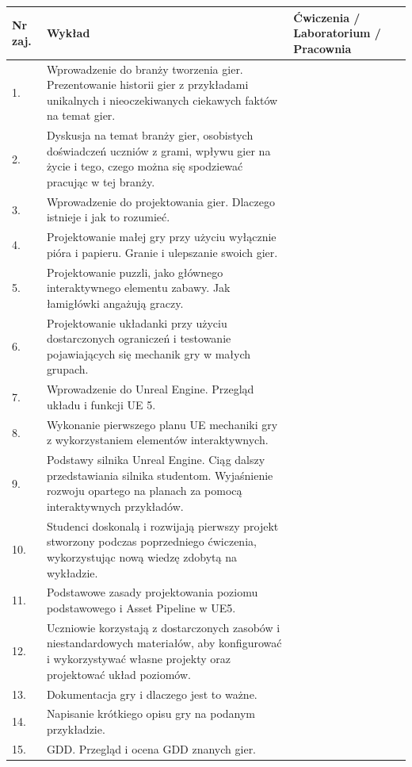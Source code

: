 \documentclass[12pt, a4paper]{article}
\begin{document}
\begin{longtable}{|p{1.5cm}|p{6.5cm}|p{6.5cm}|}
\hline
\textbf{Nr zaj.} & \textbf{Wykład} & \textbf{Ćwiczenia / Laboratorium / Pracownia} \\\hline
\endhead
  \hline
  1. & Wprowadzenie do branży tworzenia gier. Prezentowanie historii gier z przykładami unikalnych i nieoczekiwanych ciekawych faktów na temat gier. &  \\
  \hline
  2. & Dyskusja na temat branży gier, osobistych doświadczeń uczniów z grami, wpływu gier na życie i tego, czego można się spodziewać pracując w tej branży. &  \\
  \hline
  3. & Wprowadzenie do projektowania gier. Dlaczego istnieje i jak to rozumieć. &  \\
  \hline
  4. & Projektowanie małej gry przy użyciu wyłącznie pióra i papieru. Granie i ulepszanie swoich gier. &  \\
  \hline
  5. & Projektowanie puzzli, jako głównego interaktywnego elementu zabawy. Jak łamigłówki angażują graczy. &  \\
  \hline
  6. & Projektowanie układanki przy użyciu dostarczonych ograniczeń i testowanie pojawiających się mechanik gry w małych grupach. &  \\
  \hline
  7. & Wprowadzenie do Unreal Engine. Przegląd układu i funkcji UE 5. &  \\
  \hline
  8. & Wykonanie pierwszego planu UE mechaniki gry z wykorzystaniem elementów interaktywnych. &  \\
  \hline
  9. & Podstawy silnika Unreal Engine. Ciąg dalszy przedstawiania silnika studentom. Wyjaśnienie rozwoju opartego na planach za pomocą interaktywnych przykładów. &  \\
  \hline
  10. & Studenci doskonalą i rozwijają pierwszy projekt stworzony podczas poprzedniego ćwiczenia, wykorzystując nową wiedzę zdobytą na wykładzie. &  \\
  \hline
  11. & Podstawowe zasady projektowania poziomu podstawowego i Asset Pipeline w UE5. &  \\
  \hline
  12. & Uczniowie korzystają z dostarczonych zasobów i niestandardowych materiałów, aby konfigurować i wykorzystywać własne projekty oraz projektować układ poziomów. &  \\
  \hline
  13. & Dokumentacja gry i dlaczego jest to ważne. &  \\
  \hline
  14. & Napisanie krótkiego opisu gry na podanym przykładzie. &  \\
  \hline
  15. & GDD. Przegląd i ocena GDD znanych gier. &  \\

\end{longtable}
\end{document}
